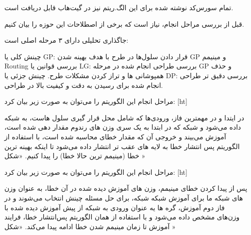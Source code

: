 تمام سورس‌کد نوشته شده برای این الگ.ریتم نیز در گیت‌هاب قابل دریافت است.



قبل از بررسی مراحل انجام، نیاز است که برخی از اصطلاحات این حوزه را بیان کنیم.

جاگذاری تحلیلی دارای ۳ مرحله اصلی است:

 چینش کلی یا GP: قرار دادن سلول‌ها در طرح با هدف بهینه شدن GP و مینیمم Routing
 بررسی قوانین یا LG: بررسی طراحی انجام شده در مرحله GP و حذف همپوشانی ها و تراز کردن مشکلات طرح.
 چینش جزئی یا DP: بررسی دقیق تر طراحی انجام شده برای رسیدن به دقت و کیفیت بالا در طراحی.


مراحل انجام این الگوریتم را می‌توان به صورت زیر بیان کرد:
[ht]

در ایتدا و در مهمترین فاز، ورودی‌ها که شامل محل قرار گیری سلول هاست، به شبکه داده می‌شود و شبکه که در ابتدا به یک سری وزن های رندوم مقدار دهی شده است، آموزش می‌بیند و خروجی آن که مقدار خطای محاسبه شده است، با استفاده از الگوریتم پس انتشار خطا به لایه های عقب تر انتشار داده می‌شود تا اینکه بهینه ترین خطا (مینیمم ترین حالا خطا) را پیدا کنیم. «شکل »



مراحل انجام این الگوریتم را می‌توان به صورت زیر بیان کرد:
[ht]




پس از پیدا کردن خطای مینیمم، وزن های آموزش دیده شده در آن خطا، به عنوان وزن های شبکه ما برای آموزش شبکه شبکه، برای حل مسئله چینش انتخاب می‌شوند و در فاز دوم آموزش، گره ها یه عنوان ورودی به شبکه از پیش آموزش دیده شده با وزن‌های مشخص داده می‌شود و با استفاده از همان الگوریتم پس‌انتشار خطا، فرایند آموزش تا زمان مینیمم شدن خطا ادامه پیدا می‌کند. «شکل »


